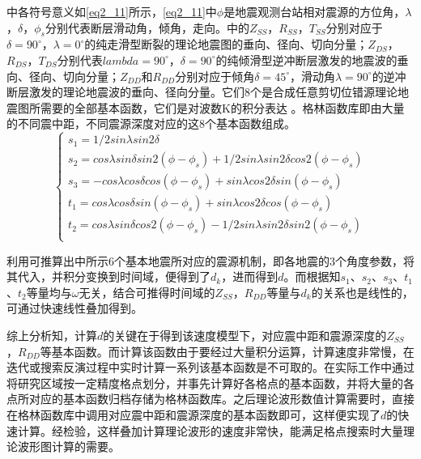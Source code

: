 中各符号意义如\ref{eq2_11}所示，\ref{eq2_11}中$\phi$是地震观测台站相对震源的方位角，$\lambda$，$\delta$，${\phi}_s$分别代表断层滑动角，倾角，走向。中的$Z_{SS}$，$R_{SS}$，$T_{SS}$分别对应于$\delta=90^\circ$，$\lambda=0^\circ$的纯走滑型断裂的理论地震图的垂向、径向、切向分量；$Z_{DS}$，$R_{DS}$，$T_{DS}$分别代表$lambda=90^\circ$，$\delta=90^\circ$的纯倾滑型逆冲断层激发的地震波的垂向、径向、切向分量；$Z_{DD}$和$R_{DD}$分别对应于倾角$\delta=45^\circ$，滑动角$\lambda=90^\circ$的逆冲断层激发的理论地震波的垂向、径向分量。它们8个是合成任意剪切位错源理论地震图所需要的全部基本函数，它们是对波数K的积分表达\citep{Wang1980} 。格林函数库即由大量的不同震中距，不同震源深度对应的这8个基本函数组成。
\begin{equation}
\label{eq2_11}
\left\{
    \begin{array}{l}
    s_1=1/2{sin\lambda}sin{2\delta}\\
    s_2={cos\lambda}{sin\delta}sin2({\phi}-{\phi}_s)+1/2{sin\lambda}{sin2\delta}cos2({\phi}-{\phi}_s)\\
    s_3=-{cos\lambda}{cos\delta}cos({\phi}-{\phi}_s)+{sin\lambda}{cos2\delta}sin({\phi}-{\phi}_s)\\
    t_1={cos\lambda}{cos\delta}sin({\phi}-{\phi}_s)+{sin\lambda}{cos2\delta}cos({\phi}-{\phi}_s)\\
    t_2={cos\lambda}{sin\delta}cos2({\phi}-{\phi}_s)-1/2{sin\lambda}{sin2\delta}sin2({\phi}-{\phi}_s)\\
    \end{array}
\right.
\end{equation}

利用可推算出中所示6个基本地震所对应的震源机制，即各地震的3个角度参数，将其代入，并积分变换到时间域，便得到了$d_k$，进而得到$d$。而根据知$s_1$、$s_2$、$s_3$、$t_1$、$t_2$等量均与$\omega$无关，结合可推得时间域的$Z_{SS}$，$R_{DD}$等量与$d_k$的关系也是线性的，可通过快速线性叠加得到。

综上分析知，计算$d$的关键在于得到该速度模型下，对应震中距和震源深度的$Z_{SS}$，$R_{DD}$等基本函数。而计算该函数由于要经过大量积分运算，计算速度非常慢，在迭代或搜索反演过程中实时计算一系列该基本函数是不可取的。在实际工作中通过将研究区域按一定精度格点划分，并事先计算好各格点的基本函数，并将大量的各点所对应的基本函数归档存储为格林函数库。之后理论波形数值计算需要时，直接在格林函数库中调用对应震中距和震源深度的基本函数即可，这样便实现了$d$的快速计算。经检验，这样叠加计算理论波形的速度非常快，能满足格点搜索时大量理论波形图计算的需要。

